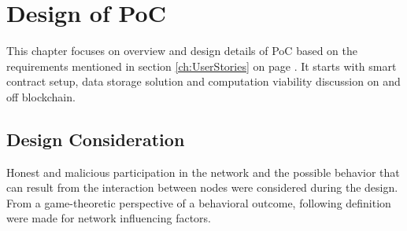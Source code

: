%

\section{Design of PoC}
This chapter focuses on overview and design details of PoC based on the
requirements mentioned in section \ref{ch:UserStories} on page
\pageref{ch:UserStories}. It starts with smart contract setup, data storage
solution and computation viability discussion on and off blockchain. 

%

\subsection{Design Consideration}
Honest and malicious participation in the network and the possible behavior
that can result from the interaction between nodes were considered during the
design. From a game-theoretic perspective of a behavioral outcome, following
definition were made for network influencing factors. 

